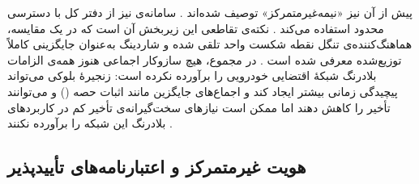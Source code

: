 \documentclass[12pt,a4paper]{article}
\begin{document}
پیش از آن نیز «نیمه‌غیرمتمرکز» توصیف شده‌اند \cite{silvanoIotaTangleCryptocurrency2020}. سامانه‌ی  نیز از دفتر کل  با دسترسی محدود استفاده می‌کند \cite{feraudoDIVADIDbasedReputation2024}. نکته‌ی تقاطعی این زیربخش آن است که در یک مقایسه، هماهنگ‌کننده‌ی تنگل نقطه شکست واحد تلقی شده و شاردینگ به‌عنوان جایگزینی کاملاً توزیع‌شده معرفی شده است \cite{ghovanlooyghajarSBTMSScalableBlockchain2021}. در مجموع، هیچ سازوکار اجماعی هنوز همه‌ی الزامات بلادرنگ شبکهٔ اقتضایی خودرویی را برآورده نکرده است: زنجیرهٔ بلوکی می‌تواند پیچیدگی زمانی بیشتر ایجاد کند \cite{farsimadanReviewSecurityChallenges2025} و اجماع‌های جایگزین مانند اثبات حصه () و  می‌توانند تأخیر را کاهش دهند اما ممکن است نیاز‌های سخت‌گیرانه‌ی تأخیر کم در کاربرد‌های بلادرنگ این شبکه را برآورده نکنند \cite{razaBlockchainBasedReputationTrust2024}.

\subsection{هویت غیرمتمرکز و اعتبارنامه‌های تأییدپذیر}
\end{document}
